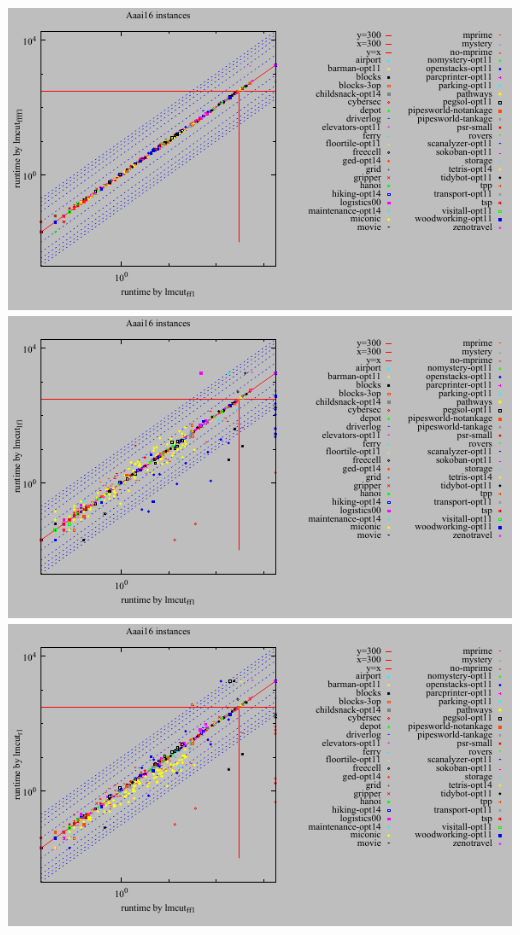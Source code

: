 \includegraphics{tables/aaai16-time-lmcut_ff-lmcut_ffff.pdf}
\linebreak
\includegraphics{tables/aaai16-time-lmcut_ff-lmcut_lf.pdf}
\linebreak
\includegraphics{tables/aaai16-time-lmcut_ff-lmcut_r.pdf}
\linebreak
